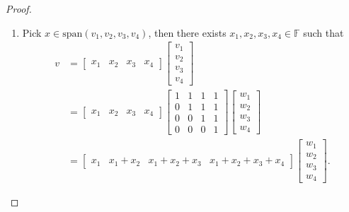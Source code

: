 \begin{proof}
\begin{enumerate}
\item Pick $x\in\text{span}(v_1,v_2,v_3,v_4)$, then there exists $x_1,x_2,x_3,x_4\in\mathbb{F}$ such that
\begin{equation*}
\begin{split}
v&=\begin{bmatrix}
x_1&x_2&x_3&x_4
\end{bmatrix}
\begin{bmatrix}v_1\\v_2\\v_3\\v_4\end{bmatrix}\\
&=\begin{bmatrix}
x_1&x_2&x_3&x_4
\end{bmatrix}
\begin{bmatrix}
     1&     1&     1&     1\\
     0&     1&     1&     1\\
     0&     0&     1&     1\\
     0&     0&     0&     1
\end{bmatrix}
\begin{bmatrix}
w_1\\
w_2\\
w_3\\
w_4\end{bmatrix}\\
&=
\begin{bmatrix}
     x_1&     x_1+x_2&     x_1+x_2+x_3&     x_1+x_2+x_3+x_4
\end{bmatrix}
\begin{bmatrix}
w_1\\
w_2\\
w_3\\
w_4
\end{bmatrix}.
\end{split}
\end{equation*}


\end{enumerate}
\end{proof}
